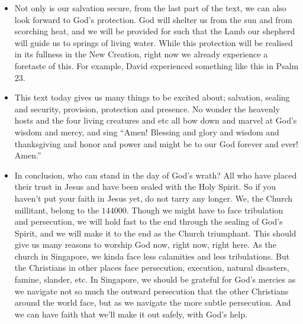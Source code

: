 \begin{itemize}
{saints in heaven are ``more happy, but not more secure''.}
\item{Not only is our salvation secure, from the last part of the text, we
can also look forward to God's protection.  God will shelter us from the sun
and from scorching heat, and we will be provided for such that the Lamb our
shepherd will guide us to springs of living water. While this protection will be realised in its fullness in the New Creation, right now we already experience a foretaste of this. For example, David experienced something like this in Psalm 23. }
\item{This text today gives us many things to be excited about; salvation,
sealing and security, provision, protection and presence.  No wonder the
heavenly hosts and the four living creatures and etc all bow down and marvel
at God's wisdom and mercy, and sing ``Amen!  Blessing and glory and wisdom
and thanksgiving and honor and power and might be to our God forever and
ever!  Amen.''}
\item{In conclusion, who can stand in the day of God's wrath?  All who have
placed their trust in Jesus and have been sealed with the Holy Spirit.  So if
you haven't put your faith in Jesus yet, do not tarry any longer.  We, the
Church millitant, belong to the $144000$.  Though we might have to face
tribulation and persecution, we will hold fast to the end through the sealing
of God's Spirit, and we will make it to the end as the Church triumphant.
This should give us many reasons to worship God now, right now, right here.
As the church in Singapore, we kinda face less calamities and less
tribulations.  But the Christians in other places face persecution,
execution, natural disasters, famine, slander, etc.  In Singapore, we should
be grateful for God's mercies as we navigate not so much the outward
persecution that the other Christians around the world face, but as we
navigate the more subtle persecution. And we can have faith that we'll make it out safely, with God's help. }
\end{itemize}